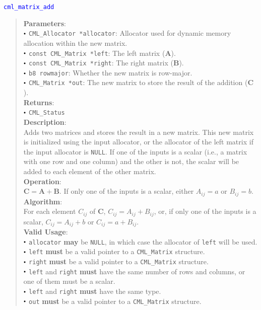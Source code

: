 \documentclass[a4paper,oneside,8pt]{extarticle}
\newcommand{\function}[1]{
  \noindent\textcolor{blue}{\texttt{#1}}
  \vspace{-0.3em}
}
\renewcommand{\dot}{\raisebox{0.3ex}{\scalebox{0.6}{$\bullet$}}}
\theoremstyle{definition}
\begin{document}
\function{cml\_matrix\_add}
\begin{quote}
  \textbf{Parameters}: \\
  $\dot$ \texttt{CML\_Allocator *allocator}: Allocator used for dynamic memory allocation within the new matrix. \\
  $\dot$ \texttt{const CML\_Matrix *left}: The left matrix ($\mathbf{A}$). \\
  $\dot$ \texttt{const CML\_Matrix *right}: The right matrix ($\mathbf{B}$). \\
  $\dot$ \texttt{b8 rowmajor}: Whether the new matrix is row-major. \\
  $\dot$ \texttt{CML\_Matrix *out}: The new matrix to store the result of the addition ($\mathbf{C}$). \\
  \textbf{Returns}: \\
  $\dot$ \texttt{CML\_Status} \\

  \vspace{-0.75em}
  \textbf{Description}: \\
  Adds two matrices and stores the result in a new matrix. This new matrix is initialized using the input allocator, or the allocator of the left matrix if the input allocator is \texttt{NULL}. If one of the inputs is a scalar (i.e., a matrix with one row and one column) and the other is not, the scalar will be added to each element of the other matrix. \\

  \vspace{-0.75em}
  \textbf{Operation}: \\
  $\mathbf{C} = \mathbf{A} + \mathbf{B}$. If only one of the inputs is a scalar, either $A_{ij} = a$ or $B_{ij} = b$. \\

  \vspace{-0.75em}
  \textbf{Algorithm}: \\
  For each element $C_{ij}$ of $\mathbf{C}$, $C_{ij} = A_{ij} + B_{ij}$, or, if only one of the inputs is a scalar, $C_{ij} = A_{ij} + b$ or $C_{ij} = a + B_{ij}$. \\

  \vspace{-0.75em}
  \textbf{Valid Usage}: \\
  $\dot$ \texttt{allocator} \textbf{may} be \texttt{NULL}, in which case the allocator of \texttt{left} will be used. \\
  $\dot$ \texttt{left} \textbf{must} be a valid pointer to a \texttt{CML\_Matrix} structure. \\
  $\dot$ \texttt{right} \textbf{must} be a valid pointer to a \texttt{CML\_Matrix} structure. \\
  $\dot$ \texttt{left} and \texttt{right} \textbf{must} have the same number of rows and columns, or one of them must be a scalar. \\
  $\dot$ \texttt{left} and \texttt{right} \textbf{must} have the same type. \\
  $\dot$ \texttt{out} \textbf{must} be a valid pointer to a \texttt{CML\_Matrix} structure. \\


\end{quote}
\end{document}
